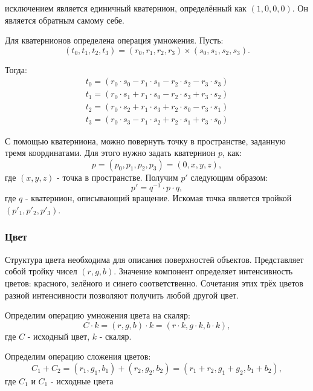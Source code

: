 \documentclass[a4paper, 14pt]{report} %
\begin{document}
	исключением является единичный кватернион, определённый как $(1, 0, 0, 0)$. Он является обратным самому себе.
	
	Для кватернионов определена операция умножения. Пусть:
	\begin{equation}
			(t_0, t_1, t_2, t_3) = (r_0, r_1, r_2, r_3)\times(s_0, s_1, s_2, s_3).
	\end{equation}
	
	Тогда:
	\begin{subequations}
		\begin{align}
		t_0=(r_0\cdot s_0-r_1\cdot s_1-r_2\cdot s_2-r_3\cdot s_3) \\
		t_1=(r_0\cdot s_1+r_1\cdot s_0-r_2\cdot s_3+r_3\cdot s_2) \\
		t_2=(r_0\cdot s_2+r_1\cdot s_3+r_2\cdot s_0-r_3\cdot s_1) \\
		t_3=(r_0\cdot s_3-r_1\cdot s_2+r_2\cdot s_1+r_3\cdot s_0)
		\end{align}
	\end{subequations}
	
	С помощью кватерниона, можно повернуть точку в пространстве, заданную тремя координатами. Для этого нужно задать кватернион $p$, как:
	\begin{equation}
		p=(p_0,p_1,p_2,p_3)=(0, x, y, z),
	\end{equation}
	где $(x, y, z)$ - точка в пространстве. Получим $p'$ следующим образом:
	\begin{equation}
		p'=q^{-1}\cdot p\cdot q,
	\end{equation}
	где $q$ - кватернион, описывающий вращение. Искомая точка является тройкой $(p'_1, p'_2, p'_3)$.
	
	\subsubsection{Цвет}
	Структура цвета необходима для описания поверхностей объектов. Представляет собой тройку чисел $(r, g, b)$. Значение компонент определяет интенсивность цветов: красного, зелёного и синего соответственно. Сочетания этих трёх цветов разной интенсивности позволяют получить любой другой цвет.
	
	Определим операцию умножения цвета на скаляр:
	\begin{equation}
		C\cdot k=(r, g, b)\cdot k=(r\cdot k, g\cdot k, b\cdot k),
	\end{equation}
	где $C$ - исходный цвет, $k$ - скаляр.
	
	Определим операцию сложения цветов:
	\begin{equation}
		C_1+C_2=(r_1, g_1, b_1)+(r_2, g_2, b_2)=(r_1+r_2,g_1+g_2,b_1+b_2),
	\end{equation}
	где $C_1$ и $C_1$ - исходные цвета
	
\end{document}
